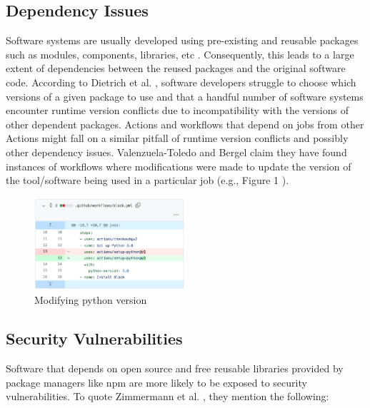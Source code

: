 \documentclass[conference]{IEEEtran}
\begin{document}
    \subsection{Dependency Issues}
        Software systems are usually developed using pre-existing and reusable packages such as modules, components, libraries, etc \cite{decan2019empirical}\cite{soto2021comprehensive}. Consequently, this leads to a large extent of dependencies between the reused packages and the original software code. According to Dietrich et al. \cite{dietrich2019dependency}, software developers struggle to choose which versions of a given package to use and that a handful number of software systems encounter runtime version conflicts due to incompatibility with the versions of other dependent packages. Actions and workflows that depend on jobs from other Actions might fall on a similar pitfall of runtime version conflicts and possibly other dependency issues. Valenzuela-Toledo and Bergel \cite{valenzuela2022evolution} claim they have found instances of workflows where modifications were made to update the version of the tool/software being used in a particular job (e.g., Figure 1 \cite{valenzuela2022evolution}).

\begin{figure} [H]
\includegraphics[width=0.5\textwidth]{Figure 1.png}
\caption{Modifying python version \cite{valenzuela2022evolution} }
\end{figure}

    \subsection{Security Vulnerabilities}
        Software that depends on open source and free reusable libraries provided by package managers like npm are more likely to be exposed to security vulnerabilities. To quote Zimmermann et al. \cite{zimmermann2019small}, they mention the following: \\
\end{document}
